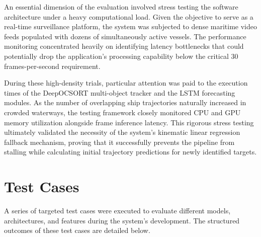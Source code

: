 An essential dimension of the evaluation involved stress testing the software architecture under a heavy computational load. Given the objective to serve as a real-time surveillance platform, the system was subjected to dense maritime video feeds populated with dozens of simultaneously active vessels. The performance monitoring concentrated heavily on identifying latency bottlenecks that could potentially drop the application's processing capability below the critical 30 frames-per-second requirement. 

During these high-density trials, particular attention was paid to the execution times of the DeepOCSORT multi-object tracker and the LSTM forecasting modules. As the number of overlapping ship trajectories naturally increased in crowded waterways, the testing framework closely monitored CPU and GPU memory utilization alongside frame inference latency. This rigorous stress testing ultimately validated the necessity of the system's kinematic linear regression fallback mechanism, proving that it successfully prevents the pipeline from stalling while calculating initial trajectory predictions for newly identified targets.

\section{Test Cases}

A series of targeted test cases were executed to evaluate different models, architectures, and features during the system's development. The structured outcomes of these test cases are detailed below.

